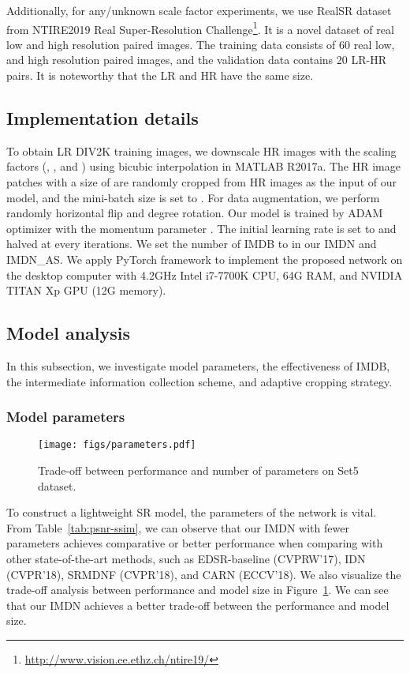\documentclass[sigconf]{acmart}
\begin{document}
Additionally, for any/unknown scale factor experiments, we use RealSR dataset from NTIRE2019 Real Super-Resolution Challenge\footnote{\url{http://www.vision.ee.ethz.ch/ntire19/}}. It is a novel dataset of real low and high resolution paired images. The training data consists of 60 real low, and high resolution paired images, and the validation data contains 20 LR-HR pairs. It is noteworthy that the LR and HR have the same size. 
\subsection{Implementation details}
To obtain LR DIV2K training images, we downscale HR images with the scaling factors (, , and ) using bicubic interpolation in MATLAB R2017a. The HR image patches with a size of  are randomly cropped from HR images as the input of our model, and the mini-batch size is set to . For data augmentation, we perform randomly horizontal flip and  degree rotation. Our model is trained by ADAM optimizer with the momentum parameter . The initial learning rate is set to  and halved at every  iterations. We set the number of IMDB to  in our IMDN and IMDN\_AS. We apply PyTorch framework to implement the proposed network on the desktop computer with 4.2GHz Intel i7-7700K CPU, 64G RAM, and NVIDIA TITAN Xp GPU (12G memory).

\subsection{Model analysis}
In this subsection, we investigate model parameters, the effectiveness of IMDB, the intermediate information collection scheme, and adaptive cropping strategy.
\subsubsection{Model parameters}
\begin{figure}[htpb]
	\centering
	\texttt{[image: figs/parameters.pdf]}
	\vspace{-3mm}
	\caption{Trade-off between performance and number of parameters on Set5  dataset.}
	\label{fig:parameters}
\end{figure}
To construct a lightweight SR model, the parameters of the network is vital. From Table~\ref{tab:psnr-ssim}, we can observe that our IMDN with fewer parameters achieves comparative or better performance when comparing with other state-of-the-art methods, such as EDSR-baseline (CVPRW'17), IDN (CVPR'18), SRMDNF (CVPR'18), and CARN (ECCV'18). We also visualize the trade-off analysis between performance and model size in Figure~\ref{fig:parameters}. We can see that our IMDN achieves a better trade-off between the performance and model size.
\end{document}
